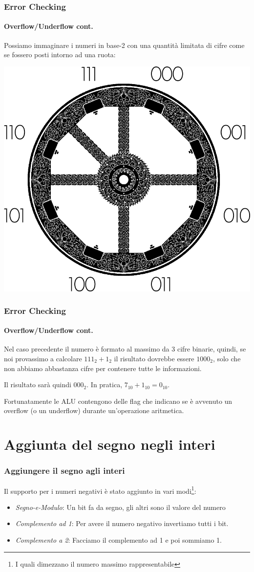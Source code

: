 \documentclass{beamer}
\begin{document}
	\begin{frame}
    \frametitle{Error Checking}
    \framesubtitle{Overflow/Underflow cont.}
    Possiamo immaginare i numeri in base-2 con una quantità limitata di cifre come se fossero posti
    intorno ad una ruota:
    
    \begin{center}
    \includegraphics[width=.5\textwidth]{IMGs/TheBurningWheel.png}
    \end{center}

  \end{frame}
  
  	\begin{frame}
    \frametitle{Error Checking}
    \framesubtitle{Overflow/Underflow cont.}
    Nel caso precedente il numero è formato al massimo da 3 cifre binarie, quindi, se noi provassimo a
    calcolare $111_{2} + 1_{2}$ il risultato dovrebbe essere $1000_{2}$, solo che non abbiamo abbastanza
    cifre per contenere tutte le informazioni.
    
    Il risultato sarà quindi $000_{2}$. In pratica, $7_{10} + 1_{10} = 0_{10}$.
    
    \vspace{2em}
    \pause
    
    Fortunatamente le ALU contengono delle flag che indicano se è avvenuto un overflow (o un underflow)
    durante un'operazione aritmetica.
  \end{frame}
  
  \section[NegativeRep]{Aggiunta del segno negli interi}
  \begin{frame}
  		\frametitle{Aggiungere il segno agli interi}
  		Il supporto per i numeri negativi è stato aggiunto in vari modi\footnote{I quali dimezzano il
  		numero massimo rappresentabile}:
    \begin{itemize}
    		\item \emph{Segno-e-Modulo}: Un bit fa da segno, gli altri sono il valore del numero
    		\item \emph{Complemento ad 1}: Per avere il numero negativo invertiamo tutti i bit.
    		\item \emph{Complemento a 2}: Facciamo il complemento ad 1 e poi sommiamo 1.
    \end{itemize}
  \end{frame}
\end{document}
